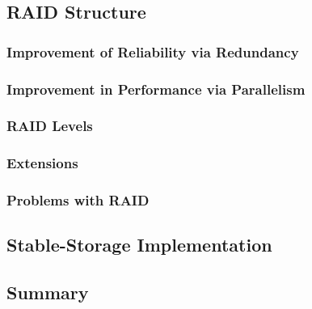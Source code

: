 \subsection{RAID Structure}
\subsubsection{Improvement of Reliability via Redundancy}
\subsubsection{Improvement in Performance via Parallelism}
\subsubsection{RAID Levels}
\subsubsection{Extensions}
\subsubsection{Problems with RAID}
\subsection{Stable-Storage Implementation}
\subsection{Summary}

